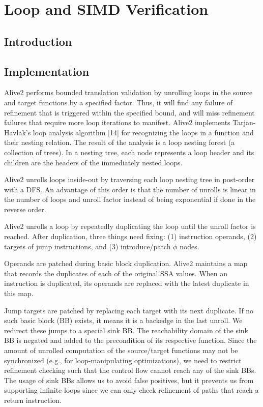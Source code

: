 \chapter{Loop and SIMD Verification}

\section{Introduction}


\section {Implementation}

Alive2 performs bounded translation validation by unrolling loops in
the source and target functions by a specified factor. Thus, it will
find any failure of refinement that is triggered within the specified
bound, and will miss refinement failures that require more loop
iterations to manifest. Alive2 implements Tarjan-Havlak’s loop
analysis algorithm [14] for recognizing the loops in a function and
their nesting relation. The result of the analysis is a loop nesting
forest (a collection of trees). In a nesting tree, each node
represents a loop header and its children are the headers of the
immediately nested loops.

Alive2 unrolls loops inside-out by traversing each loop nesting tree
in post-order with a DFS. An advantage of this order is that the
number of unrolls is linear in the number of loops and unroll factor
instead of being exponential if done in the reverse order.

Alive2 unrolls a loop by repeatedly duplicating the loop until the
unroll factor is reached. After duplication, three things need fixing:
(1) instruction operands, (2) targets of jump instructions, and (3)
introduce/patch $\phi$ nodes.

Operands are patched during basic block duplication. Alive2 maintains
a map that records the duplicates of each of the original SSA values.
When an instruction is duplicated, its operands are replaced with the
latest duplicate in this map.

Jump targets are patched by replacing each target with its next
duplicate. If no such basic block (BB) exists, it means it is a
backedge in the last unroll. We redirect these jumps to a special sink
BB. The reachability domain of the sink BB is negated and added to the
precondition of its respective function. Since the amount of unrolled
computation of the source/target functions may not be synchronized
(e.g., for loop-manipulating optimizations), we need to restrict
refinement checking such that the control flow cannot reach any of the
sink BBs. The usage of sink BBs allows us to avoid false positives,
but it prevents us from supporting infinite loops since we can only
check refinement of paths that reach a return instruction.

